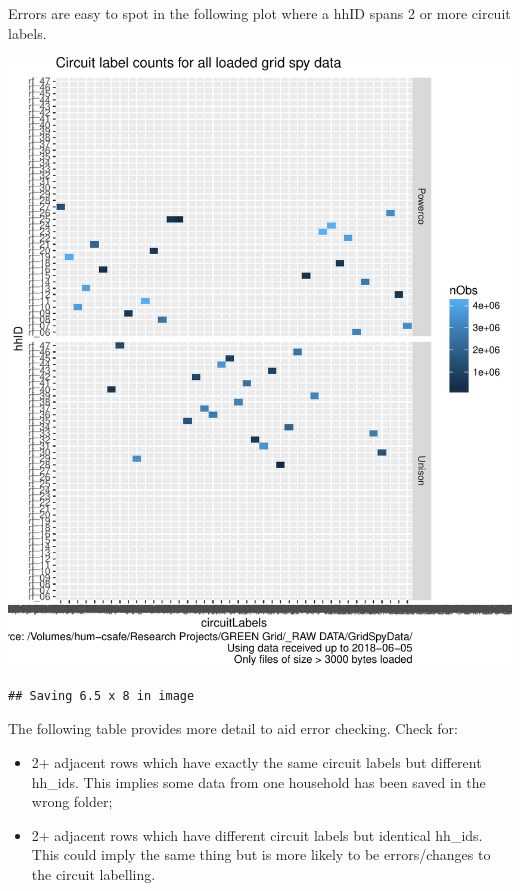 \documentclass[]{article}
\providecommand{\tightlist}{%
  \setlength{\itemsep}{0pt}\setlength{\parskip}{0pt}}
\begin{document}
Errors are easy to spot in the following plot where a hhID spans 2 or
more circuit labels.

\includegraphics{processGridSpy1minData_files/figure-latex/plotCircuitLabelIssuesAsTile-1.pdf}

\begin{verbatim}
## Saving 6.5 x 8 in image
\end{verbatim}

The following table provides more detail to aid error checking. Check
for:

\begin{itemize}
\tightlist
\item
  2+ adjacent rows which have exactly the same circuit labels but
  different hh\_ids. This implies some data from one household has been
  saved in the wrong folder;
\item
  2+ adjacent rows which have different circuit labels but identical
  hh\_ids. This could imply the same thing but is more likely to be
  errors/changes to the circuit labelling.
\end{itemize}
\end{document}
